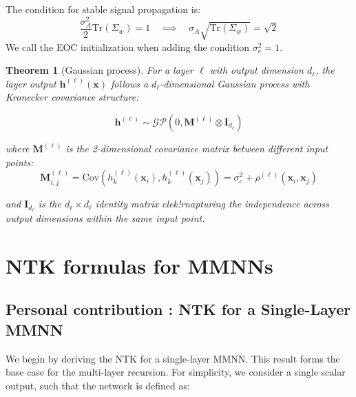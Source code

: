 \documentclass[11pt]{article}
\newtheorem{theorem}{Theorem}
\begin{document}
\begin{tcolorbox}[colback=red!15,colframe=red!80!black,title={\textbf{Edge of Chaos Condition}},enhanced,drop shadow,boxrule=2pt]

The condition for stable signal propagation is:
\begin{equation}
    \frac{\sigma_A^2}{2} \text{Tr}(\Sigma_w) = 1 \quad \implies \quad \sigma_A \sqrt{\text{Tr}(\Sigma_w)} = \sqrt{2}
\end{equation}
We call the EOC initialization when adding the condition $\sigma_c^2 =1$.
\end{tcolorbox}


\begin{theorem}[Gaussian process]

For a layer $\ell$ with output dimension $d_\ell$, the layer output $\bm{h}^{(\ell)}(\bm{x})$ follows a $d_\ell$-dimensional Gaussian process with Kronecker covariance structure:

\begin{equation}
\boxed{\bm{h}^{(\ell)} \sim \mathcal{GP}(0, \mathbf{M}^{(\ell)} \otimes \mathbf{I}_{d_\ell})}
\end{equation}

where $\mathbf{M}^{(\ell)}$ is the 2-dimensional covariance matrix between different input points:
\begin{equation}
\mathbf{M}^{(\ell)}_{i,j} = \text{Cov}(h^{(\ell)}_k(\bm{x}_i), h^{(\ell)}_k(\bm{x}_j)) = \sigma_c^2 + \rho^{(\ell)}(\bm{x}_i, \bm{x}_j)
\end{equation}

and $\mathbf{I}_{d_\ell}$ is the $d_\ell \times d_\ell$ identity matrix clek!rnapturing the independence across output dimensions within the same input point.

\end{theorem}




\newpage

\section{NTK formulas for MMNNs}

\subsection{Personal contribution : NTK for a Single-Layer MMNN}
\label{sec:single_layer_mmfn}
We begin by deriving the NTK for a single-layer MMNN. This result forms the base case for the multi-layer recursion. For simplicity, we consider a single scalar output, such that the network is defined as:
\end{document}
